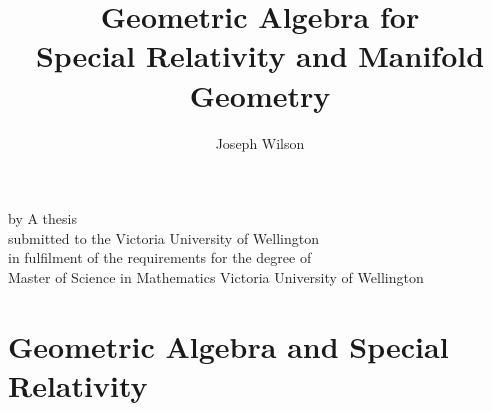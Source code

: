 \newif\ifdebug
\newif\iffinal


% 

\setlength{\parskip}{1em}

\title{Geometric Algebra for \\ Special Relativity and Manifold Geometry}
\author{Joseph Wilson}

\makeatletter
\renewcommand\maketitle{
	\begin{center}
		\null\vfill
		{\huge\bfseries\sffamily \@title}
		\vfill
		by
		\vfill
		\@author
		\vfill
		A thesis \\
		submitted to the Victoria University of Wellington \\
		in fulfilment of the requirements for the degree of \\
		Master of Science in Mathematics
		\vfill
		Victoria University of Wellington \\
		\@date
		\vfill
	\end{center}
}
\makeatother




\frontmatter
{} %

	\maketitle
	\thispagestyle{empty}

	
	
	\tableofcontents

\restoregeometry %

\ifdebug
	
\fi

\mainmatter


\part{Geometric Algebra and Special Relativity}
\label{part:1}











